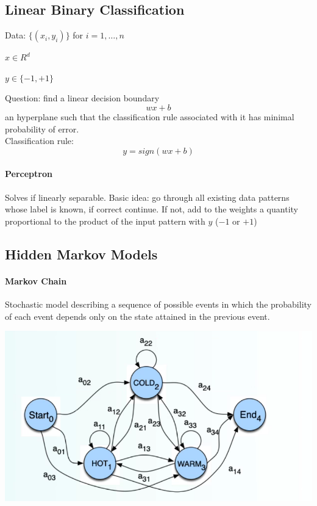 \documentclass[10pt]{report}
\begin{document}
\subsection{Linear Binary Classification}
Data: $\{(x_i,y_i)\}$ for $i=1,\ldots,n$\begin{list}{}{}
	\item $x \in R^d$
	\item $y \in \{-1,+1\}$
\end{list}
Question: find a linear decision boundary $$wx + b$$ an hyperplane such that the classification rule associated with it has minimal probability of error.\\
Classification rule: $$y = sign(wx+b)$$
\paragraph{Perceptron} Solves if linearly separable. Basic idea: go through all existing data patterns whose label is known, if correct continue. If not, add to the weights a quantity proportional to the product of the input pattern with $y$ ($-1$ or $+1$)
\subsection{Hidden Markov Models}
\paragraph{Markov Chain} Stochastic model describing a sequence of possible events in which the probability of each event depends only on the state attained in the previous event.
\begin{center}
	\includegraphics[scale=0.5]{12.png}
\end{center}
\end{document}
